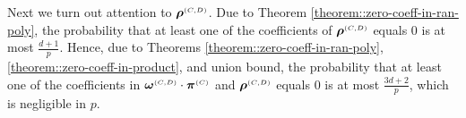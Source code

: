 Next we turn out attention to $\bm\rho^{\scriptscriptstyle (C,D)}$. Due to Theorem \ref{theorem::zero-coeff-in-ran-poly}, the probability that at least one of the coefficients of $\bm\rho^{\scriptscriptstyle (C,D)}$ equals $0$ is at most $\frac{d+1}{p}$. 
%
Hence, due to Theorems \ref{theorem::zero-coeff-in-ran-poly}, \ref{theorem::zero-coeff-in-product}, and union bound, the probability that at least one of the coefficients in $\bm\omega^{\scriptscriptstyle (C,D)}\cdot \bm\pi^{\scriptscriptstyle  {  {(C)}}}$ and  $\bm\rho^{\scriptscriptstyle (C,D)}$ equals $0$ is at most $\frac{3d+2}{p}$, which is negligible in  $p$. 















